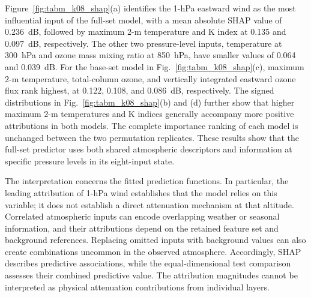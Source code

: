 Figure~\ref{fig:tabm_k08_shap}(a) identifies the 1-hPa
eastward wind as the most influential input of the
full-set model, with a mean absolute SHAP value of
0.236~dB, followed by maximum 2-m temperature and
K index at 0.135 and 0.097~dB, respectively.
The other two pressure-level inputs, temperature at
300~hPa and ozone mass mixing ratio at 850~hPa,
have smaller values of 0.064 and 0.039~dB.
For the base-set model in Fig.~\ref{fig:tabm_k08_shap}(c),
maximum 2-m temperature, total-column ozone, and
vertically integrated eastward ozone flux rank highest,
at 0.122, 0.108, and 0.086~dB, respectively.
The signed distributions in Fig.~\ref{fig:tabm_k08_shap}(b)
and (d) further show that higher maximum 2-m temperatures
and K indices generally accompany more positive
attributions in both models.
The complete importance ranking of each model is
unchanged between the two permutation replicates.
These results show that the full-set predictor uses
both shared atmospheric descriptors and information
at specific pressure levels in its eight-input state.

The interpretation concerns the fitted prediction
functions. In particular, the leading attribution of
1-hPa wind establishes that the model relies on this
variable; it does not establish a direct attenuation
mechanism at that altitude.
Correlated atmospheric inputs can encode overlapping
weather or seasonal information, and their attributions
depend on the retained feature set and background
references. Replacing omitted inputs with background
values can also create combinations uncommon in the
observed atmosphere.
Accordingly, SHAP describes predictive associations,
while the equal-dimensional test comparison assesses
their combined predictive value. The attribution
magnitudes cannot be interpreted as physical
attenuation contributions from individual layers.
